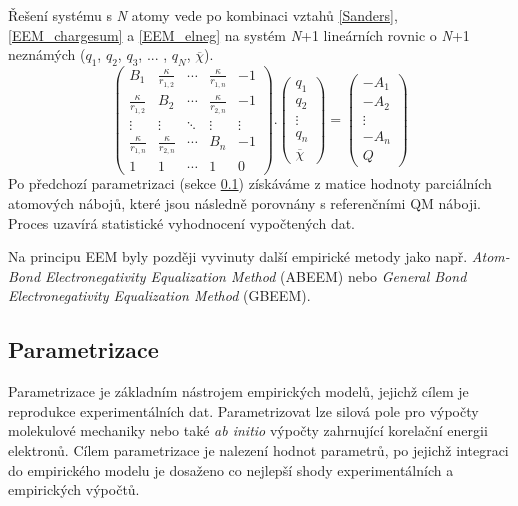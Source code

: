 Řešení systému s \textit{N} atomy vede po kombinaci vztahů  \ref{Sanders}, \ref{EEM_chargesum} a \ref{EEM_elneg} na systém \textit{N}+1 lineárních rovnic o \textit{N}+1 neznámých ($q_1$, $q_2$, $q_3$, ... , $q_N$, $\overline{\chi}$).
\begin{equation}
\label{EEM_matrix}
 \begin{pmatrix}
  B_{1} & \frac{\kappa}{r_{1,2}} & \cdots & \frac{\kappa}{r_{1,n}} & -1\\
  \frac{\kappa}{r_{1,2}} & B_{2} & \cdots & \frac{\kappa}{r_{2,n}} & -1 \\
  \vdots  & \vdots  & \ddots & \vdots & \vdots  \\
  \frac{\kappa}{r_{1,n}} & \frac{\kappa}{r_{2,n}} & \cdots & B_{n} & -1 \\
  1 & 1 & \cdots & 1 & 0
 \end{pmatrix} .
 \begin{pmatrix}
 q_{1} \\ q_{2} \\ \vdots \\ q_{n} \\ \overline{\chi}
 \end{pmatrix} =
 \begin{pmatrix}
 -A_{1} \\ -A_{2} \\ \vdots \\ -A_{n} \\ Q
 \end{pmatrix}
\end{equation}
Po předchozí parametrizaci (sekce \ref{param}) získáváme z matice hodnoty parciálních atomových nábojů, které jsou následně porovnány s referenčními QM náboji. Proces uzavírá statistické vyhodnocení vypočtených dat.

Na principu EEM byly později vyvinuty další empirické metody jako např. \textit{Atom-Bond Electronegativity Equalization Method} (ABEEM) nebo \textit{General Bond Electronegativity Equalization Method} (GBEEM).

\subsection{Parametrizace}
\label{param}
Parametrizace je základním nástrojem empirických modelů, jejichž cílem je reproduk\-ce experimentálních dat. Parametrizovat lze silová pole pro výpočty molekulové mechaniky nebo také \textit{ab initio} výpočty zahrnující korelační energii elektronů. Cílem parametrizace je nalezení hodnot parametrů, po jejichž integraci do empirického modelu je dosaženo co nejlepší shody experimentálních a empirických výpočtů. 

